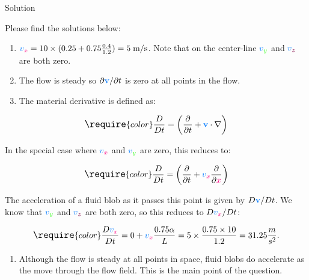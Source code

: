 \documentclass[
  1.2em,
  letterpaper,
  DIV=11,
  numbers=noendperiod]{scrartcl}
\providecommand{\tightlist}{%
  \setlength{\itemsep}{0pt}\setlength{\parskip}{0pt}}\usepackage{longtable,booktabs,array}
\begin{document}
Solution

Please find the solutions below:

\begin{enumerate}
\def\labelenumi{\arabic{enumi}.}
\item
  \({\color[rgb]{0.059472,0.501943,0.998465}v}_{{\color[rgb]{0.986048,0.008333,0.501924}x}} = 10 \times (0.25 + 0.75\frac{0.4}{1.2}) = 5 \; \textrm{m}/\textrm{s}\).
  Note that on the center-line
  \({\color[rgb]{0.059472,0.501943,0.998465}v}_{{\color[rgb]{0.131302,0.999697,0.023594}y}}\)
  and
  \({\color[rgb]{0.059472,0.501943,0.998465}v}_{{\color[rgb]{0.501963,0.000037,0.250983}z}}\)
  are both zero.
\item
  The flow is steady so
  \(\partial \mathbf{{\color[rgb]{0.059472,0.501943,0.998465}v}} / \partial t\)
  is zero at all points in the flow.
\item
  The material derivative is defined as:
\end{enumerate}

\[
\large
\require{color}
\frac{D}{Dt} = \left( \frac{\partial }{\partial t}  + \mathbf{{\color[rgb]{0.059472,0.501943,0.998465}v}} \cdot \nabla \right)
\]

In the special case where
\({\color[rgb]{0.059472,0.501943,0.998465}v}_{{\color[rgb]{0.986048,0.008333,0.501924}x}}\)
and
\({\color[rgb]{0.059472,0.501943,0.998465}v}_{{\color[rgb]{0.131302,0.999697,0.023594}y}}\)
are zero, this reduces to:

\[
\large
\require{color}
\frac{D}{Dt} = \left( \frac{\partial}{\partial t} + {\color[rgb]{0.059472,0.501943,0.998465}v}_{{\color[rgb]{0.986048,0.008333,0.501924}x}} \frac{\partial}{\partial {\color[rgb]{0.986048,0.008333,0.501924}x}} \right)
\]

The acceleration of a fluid blob as it passes this point is given by
\(D \mathbf{{\color[rgb]{0.059472,0.501943,0.998465}v}} / Dt\). We know
that
\({\color[rgb]{0.059472,0.501943,0.998465}v}_{\color[rgb]{0.131302,0.999697,0.023594}y}\)
and
\({\color[rgb]{0.059472,0.501943,0.998465}v}_{\color[rgb]{0.501963,0.000037,0.250983}z}\)
are both zero, so this reduces to
\(D{\color[rgb]{0.059472,0.501943,0.998465}v}_{{\color[rgb]{0.986048,0.008333,0.501924}x}} / Dt\):

\[
\large
\require{color}
\frac{D {\color[rgb]{0.059472,0.501943,0.998465}v}_{{\color[rgb]{0.986048,0.008333,0.501924}x}}}{Dt} = 0 + {\color[rgb]{0.059472,0.501943,0.998465}v}_{{\color[rgb]{0.986048,0.008333,0.501924}x}} \frac{0.75 \alpha}{L} = 5 \times \frac{0.75 \times 10}{1.2} = 31.25 \frac{m}{s^2}. 
\]

\begin{enumerate}
\def\labelenumi{\arabic{enumi}.}
\setcounter{enumi}{3}
\tightlist
\item
  Although the flow is steady at all points in space, fluid blobs do
  accelerate as the move through the flow field. This is the main point
  of the question.
\end{enumerate}
\end{document}
